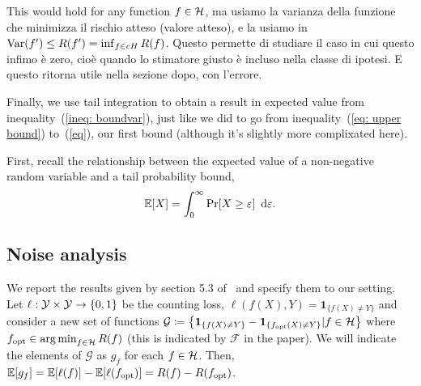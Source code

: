 \documentclass[reqno]{amsart}
\begin{document}
This would hold for any function $f\in\mathcal{H}$, ma usiamo la varianza della funzione che minimizza il rischio atteso (valore atteso), e la usiamo in $\operatorname{Var}(f') \le R(f') = \inf_{f\in cH} R(f)$. Questo permette di studiare il caso in cui questo infimo è zero, cioè quando lo stimatore giusto è incluso nella classe di ipotesi. E questo ritorna utile nella sezione dopo, con l'errore.

Finally, we use tail integration to obtain a result in expected value from inequality~(\ref{ineq: boundvar}), just like we did to go from inequality~(\ref{eq: upper bound}) to~(\ref{eq}), our first bound (although it's slightly more complixated here). 

First, recall the relationship between the expected value of a non-negative random variable and a tail probability bound,
\[
\mathbb{E}[X] = \int_0^\infty \Pr[X\ge\varepsilon] \mathop{}\!\,\,\mathrm{d} \varepsilon.
\]





\subsection{Noise analysis}

We report the results given by section 5.3 of~\cite{boucheron2005theory} and specify them to our setting.
\\

Let $\ell:\mathcal{Y}\times\mathcal{Y}\to\{0,1\}$ be the counting loss, $\ell(f(X),Y) = \mathbf{1}_{\{f(X)\neq Y\}}$ and consider a new set of functions $\mathcal G \coloneq \left\{ \mathbf{1}_{\{f(X)\neq Y\}} - \mathbf{1}_{\{f_\mathrm{opt}(X)\neq Y\}}\vert f\in\mathcal{H}\right\}$ where $f_\mathrm{opt} \in \operatorname*{arg\,min}_{f\in\mathcal{H}} R(f)$ (this is indicated by $\mathcal F$ in the paper). We will indicate the elements of $\mathcal G$ as  $g_f$ for each $f\in\mathcal{H}$. Then, $\mathbb{E}[g_f] = \mathbb{E}[\ell(f)] - \mathbb{E}[\ell(f_\mathrm{opt})] = R(f) - R(f_\mathrm{opt})$. 
\end{document}
